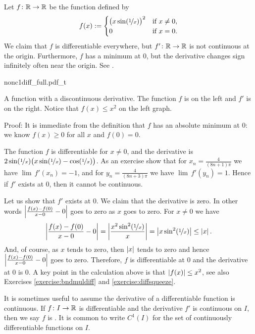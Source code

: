 \begin{example} \label{baddifffunc:example}
Let $f \colon {\mathbb{R}} \to {\mathbb{R}}$ be the function defined by
\begin{equation*}
f(x) :=
\begin{cases}
{\bigl( x \sin(\nicefrac{1}{x}) \bigr)}^2 & \text{if } x \not= 0, \\
0 & \text{if } x = 0.
\end{cases}
\end{equation*}
We claim that $f$ is differentiable everywhere, but
$f' \colon {\mathbb{R}} \to {\mathbb{R}}$ is not continuous at
the origin.  Furthermore, $f$ has a minimum at 0, but the derivative
changes sign infinitely often near the origin.
See .
\begin{myfigureht}
{nonc1diff_full.pdf_t}
\caption{A function with a discontinuous derivative. The function $f$ is on the left
and $f'$ is on the right.  Notice that $f(x) \leq x^2$ on the left graph.\label{fig:nonc1diff}}
\end{myfigureht}

Proof: It is immediate from the definition that $f$ has an absolute
minimum at 0: we know $f(x) \geq 0$ for all $x$ and $f(0) = 0$.

The function $f$ is differentiable for $x\not=0$,
and
the derivative 
is $2 \sin (\nicefrac{1}{x}) \bigl( x \sin (\nicefrac{1}{x}) -
\cos(\nicefrac{1}{x}) \bigr)$.
As an exercise show that for $x_n = \frac{4}{(8n+1)\pi}$
we have
$\lim\, f'(x_n) = -1$, and for
$y_n = \frac{4}{(8n+3)\pi}$  we have
$\lim\, f'(y_n) = 1$.  Hence if $f'$ exists at $0$,
then it cannot be continuous.

Let us show that $f'$ exists at 0.  We claim that the derivative is zero.
In other words $\left\lvert {\frac{f(x)-f(0)}{x-0} - 0} \right\rvert$ goes to zero
as $x$ goes to zero.  For $x \not= 0$ we have
\begin{equation*}
\left\lvert {\frac{f(x)-f(0)}{x-0} - 0} \right\rvert
=
\left\lvert {\frac{x^2 \sin^2(\nicefrac{1}{x})}{x}} \right\rvert
=
\left\lvert {x \sin^2(\nicefrac{1}{x})} \right\rvert
\leq
\left\lvert {x} \right\rvert .
\end{equation*}
And, of course, as $x$ tends to zero, then $\left\lvert {x} \right\rvert$ tends to zero and hence
$\left\lvert {\frac{f(x)-f(0)}{x-0} - 0} \right\rvert$ goes to zero.  Therefore, $f$
is differentiable at 0 and the derivative at 0 is 0.
A key point in the calculation above
is that $\left\lvert {f(x)} \right\rvert \leq x^2$,
see also Exercises \ref{exercise:bndmuldiff} and
\ref{exercise:diffsqueeze}.
\end{example}

It is sometimes useful to assume the derivative of a differentiable
function is continuous.  If $f \colon I \to {\mathbb{R}}$ is differentiable and
the derivative $f'$ is continuous on $I$, then we say $f$ is
\emph{}.  It is common to
write $C^1(I)$ for the set of continuously differentiable functions on $I$.

